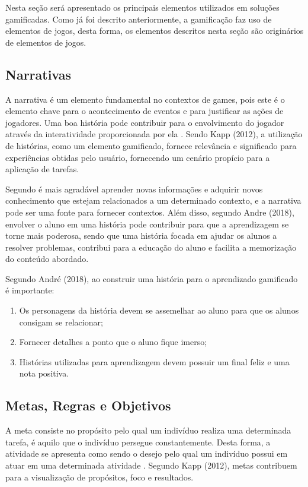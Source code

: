 \documentclass[
	12pt,				%
	oneside,			%
	a4paper,			%
	english,			%
	french,				%
	spanish,			%
	brazil,				%
	]{abntex2}
\begin{document}
Nesta seção será apresentado os principais elementos utilizados em soluções gamificadas. Como já foi descrito anteriormente, a gamificação faz uso de elementos de jogos, desta forma, os elementos descritos nesta seção são originários de elementos de jogos.

\subsection{Narrativas}

A narrativa é um elemento fundamental no contextos de games, pois este é o elemento chave para o acontecimento de eventos e para justificar as ações de jogadores. Uma boa história pode contribuir para o envolvimento do jogador através da interatividade proporcionada por ela  \cite{fardo2013gamificaccao}. Sendo Kapp (2012), a utilização de histórias, como um elemento gamificado, fornece relevância e significado para experiências obtidas pelo usuário, fornecendo um cenário propício para a aplicação de tarefas.

Segundo \citet{fardo2013gamificaccao} é mais agradável aprender novas informações e adquirir novos conhecimento que estejam relacionados a um determinado contexto, e a narrativa pode ser uma fonte para fornecer contextos. Além disso, segundo Andre (2018), envolver o aluno em uma história pode contribuir para que a aprendizagem se torne mais poderosa, sendo que uma história focada em ajudar os alunos a resolver problemas, contribui para a educação do aluno e facilita a memorização do conteúdo abordado.

Segundo André (2018), ao construir uma história para o aprendizado gamificado é importante:
\begin{enumerate}
\item Os personagens da história devem se assemelhar ao aluno para que os alunos consigam se relacionar;
\item Fornecer detalhes a ponto que o aluno fique imerso;
\item Histórias utilizadas para aprendizagem devem possuir um final feliz e uma nota positiva.
\end{enumerate}

\subsection{Metas, Regras e Objetivos}

A meta consiste no propósito pelo qual um indivíduo realiza uma determinada tarefa, é aquilo que o indivíduo persegue constantemente. Desta forma, a atividade se apresenta como sendo o desejo pelo qual um indivíduo possui em atuar em uma determinada atividade \cite{bunchball2016gamification}. Segundo Kapp (2012), metas contribuem para a visualização de propósitos, foco e resultados.
\end{document}
